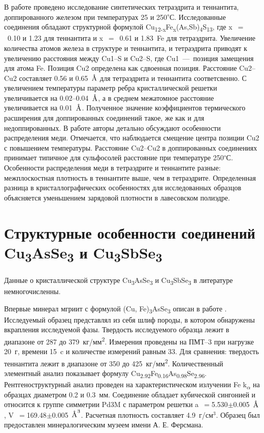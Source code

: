 В работе \cite{Friese2008} проведено исследование синтетических тетраэдрита и теннантита, доппированного железом при температурах 25 и 250\textsuperscript{$\circ$}С. Исследованные соединения обладают структурной формулой Cu\textsubscript{12-x}Fe\textsubscript{x}(As,Sb)\textsubscript{4}S\textsubscript{13}, где  x~$=$~0.10 и 1.23 для теннантита  и  x~$=$~0.61 и 1.83~Fe для тетраэдрита.
 Увеличение количества атомов железа в структуре и теннантита, и тетраэдрита приводят к увеличению расстояния между Cu1--S и Cu2--S, где Cu1~---~позиция замещения для атома Fe. Позиция Cu2 определена как сдвоенная позиция. Расстояние Cu2--Cu2 составляет 0.56 и 0.65~$\mbox{\normalfont\AA}$ для тетраэдрита и теннантита соответсвенно. С увеличением температуры параметр ребра кристаллической решетки увеличивается на 0.02--0.04~$\mbox{\normalfont\AA}$, а в среднем межатомное расстояние увеличивается на 0.01~$\mbox{\normalfont\AA}$. Полученное значение коэффициентов термического расширения для доппированных соединений такое, же как и для недоппированных.
 В работе авторы детально обсуждают особенности распределения меди. Отмечается, что наблюдается смещение центра позиции Cu2 с повышением температуры. Расстояние Cu2--Cu2 в доппированных соединениях принимает типичное для сульфосолей расстояние при температуре 250\textsuperscript{$\circ$}С. Особенности распределения меди в тетраэдрите и теннантите разные:
межплоскостная плотность в теннантите выше, чем в тетраэдрите. Определенная разница в кристаллографических особенностях для исследованных образцов объясняется уменьшением зарядовой плотности в лавесовском полиэдре.
\newpage

\section{Структурные особенности соединений Cu\textsubscript{3}AsSe\textsubscript{3} и Cu\textsubscript{3}SbSe\textsubscript{3}} \label{sect1_2}

Данные о кристаллической структуре Cu\textsubscript{3}AsSe\textsubscript{3} и Cu\textsubscript{3}SbSe\textsubscript{3} в литературе немногочисленны.

Впервые минерал мгриит с формулой (Cu, Fe)\textsubscript{3}AsSe\textsubscript{3} описан в работе \cite{Dymlcov_1983}. Исследуемый образец представлял из себя шлиф породы, в котором обнаружены вкрапления исследуемой фазы. Твердость исследуемого образца лежит в диапазоне от 287 до 379~кг/мм\textsuperscript{2}. Измерения проведены на ПМТ--3 при нагрузке 20~г, времени 15~c и количестве измерений равным 33. Для сравнения: твердость теннантита лежит в диапазоне от 350 до 425~кг/мм\textsuperscript{2}. Количественный элементный анализ показывает формулу Cu\textsubscript{2.92}Fe\textsubscript{0.16}As\textsubscript{0.98}Se\textsubscript{2.96}. Рентгеноструктурный анализ проведен на характеристическом излучении Fe k\textsubscript{$\alpha$} на образцах диаметром 0.2 и 0.3~мм. Соединение обладает кубической сингонией и относится к группе симметрии Pd3M с параметром решетки a~$=$5.530$\pm$0.005~$\mbox{\normalfont\AA}$, V~$=$169.48$\pm$0.005~$\mbox{\normalfont\AA}^{3}$. Расчетная плотность составляет 4.9~г/см$^{3}$. Образец был предоставлен минералогическим музеем имени А. Е. Ферсмана.

